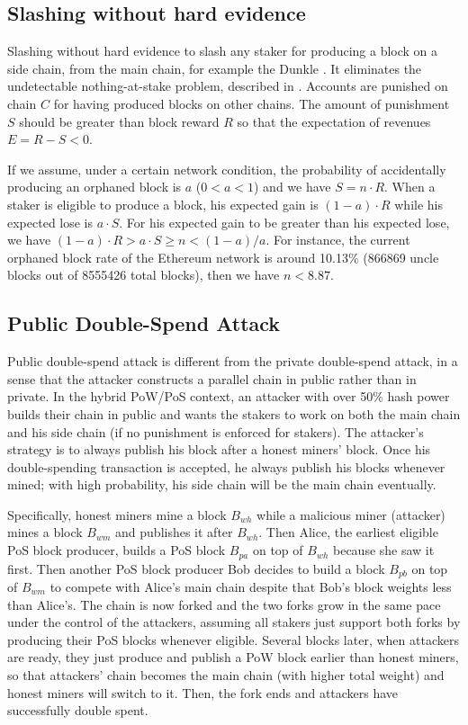 \documentclass[a4paper]{article}
\begin{document}
\begin{appendices}
\subsection{Slashing without hard evidence}

Slashing without hard evidence to slash any staker for producing a block on a side chain, from the main chain, for example the Dunkle \cite{ethereum2}. It eliminates the undetectable nothing-at-stake problem, described in \cite{brown2018formal}.  Accounts are punished on chain $C$ for having produced blocks on other chains. The amount of punishment $S$ should be greater than block reward $R$ so that the expectation of revenues $E = R - S < 0$.

If we assume, under a certain network condition, the probability of accidentally producing an orphaned block is $a$ ($0 < a < 1$) and we have $S = n \cdot R$. When a staker is eligible to produce a block, his expected gain is $(1 - a) \cdot R$ while his expected lose is $a \cdot S$. For his expected gain to be greater than his expected lose, we have $(1 - a) \cdot R > a \cdot S  \geq   n < (1 - a) / a$. For instance, the current orphaned block rate of the Ethereum network is around 10.13\% (866869 uncle blocks out of 8555426 total blocks), then we have $n < 8.87$.

\subsection{Public Double-Spend Attack}

Public double-spend attack is different from the private double-spend attack, in a sense that the attacker constructs a parallel chain in public rather than in private. In the hybrid PoW/PoS context, an  attacker with over 50\% hash power builds their chain in public and wants the stakers to work on both the main chain and his side chain (if no punishment is enforced for stakers). The attacker's strategy is to always publish his block after a honest miners' block. Once his double-spending transaction is accepted, he always publish his blocks whenever mined; with high probability, his side chain will be the main chain eventually. 

Specifically, honest miners mine a block $B_{wh}$ while a malicious miner (attacker) mines a block $B_{wm}$ and publishes it after $B_{wh}$. Then Alice, the earliest eligible PoS block producer, builds a PoS block $B_{pa}$ on top of $B_{wh}$ because she saw it first. Then another PoS block producer Bob decides to build a block $B_{pb}$ on top of $B_{wm}$ to compete with Alice's main chain despite that Bob's block weights less than Alice's. The chain is now forked and the two forks grow in the same pace under the control of the attackers, assuming all stakers just support both forks by producing their PoS blocks whenever eligible. Several blocks later, when attackers are ready, they just produce and publish a PoW block earlier than honest miners, so that attackers' chain becomes the main chain (with higher total weight) and honest miners will switch to it. Then, the fork ends and attackers have successfully double spent.


\end{appendices}
\end{document}
